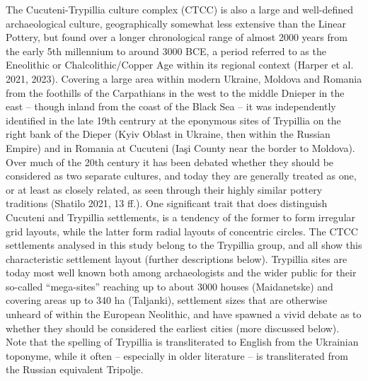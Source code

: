 \documentclass[
  12pt,
  a4paper, twoside]{book}
\begin{document}
The Cucuteni-Trypillia culture complex (CTCC) is also a large and well-defined archaeological culture, geographically somewhat less extensive than the Linear Pottery, but found over a longer chronological range of almost 2000 years from the early 5th millennium to around 3000 BCE, a period referred to as the Eneolithic or Chalcolithic/Copper Age within its regional context (Harper et al. 2021, 2023). Covering a large area within modern Ukraine, Moldova and Romania from the foothills of the Carpathians in the west to the middle Dnieper in the east -- though inland from the coast of the Black Sea -- it was independently identified in the late 19th centrury at the eponymous sites of Trypillia on the right bank of the Dieper (Kyiv Oblast in Ukraine, then within the Russian Empire) and in Romania at Cucuteni (Iaşi County near the border to Moldova). Over much of the 20th century it has been debated whether they should be considered as two separate cultures, and today they are generally treated as one, or at least as closely related, as seen through their highly similar pottery traditions (Shatilo 2021, 13 ff.). One significant trait that does distinguish Cucuteni and Trypillia settlements, is a tendency of the former to form irregular grid layouts, while the latter form radial layouts of concentric circles. The CTCC settlements analysed in this study belong to the Trypillia group, and all show this characteristic settlement layout (further descriptions below). Trypillia sites are today most well known both among archaeologists and the wider public for their so-called ``mega-sites'' reaching up to about 3000 houses (Maidanetske) and covering areas up to 340 ha (Taljanki), settlement sizes that are otherwise unheard of within the European Neolithic, and have spawned a vivid debate as to whether they should be considered the earliest cities (more discussed below). Note that the spelling of Trypillia is transliterated to English from the Ukrainian toponyme, while it often -- especially in older literature -- is transliterated from the Russian equivalent Tripolje.
\end{document}
